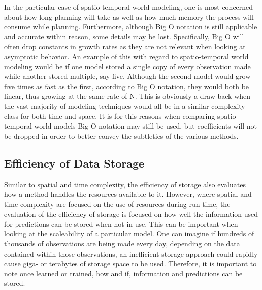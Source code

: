  In the particular case of spatio-temporal world modeling, one is most
  concerned about how long planning will take as well as how much memory the
  process will consume while planning. Furthermore, although Big O notation is
  still applicable and accurate within reason, some details may be lost.
  Specifically, Big O will often drop constants in growth rates as they are
  not relevant when looking at asymptotic behavior. An example of this with
  regard to spatio-temporal world modeling would be if one model stored a
  single copy of every observation made while another stored multiple, say
  five. Although the second model would grow five times as fast as the first,
  according to Big O notation, they would both be linear, thus growing at the
  same rate of N. This is obviously a draw back when the vast majority of
  modeling techniques would all be in a similar complexity class for both time
  and space. It is for this reasons when comparing spatio-temporal world
  models Big O notation may still be used, but coefficients will not be
  dropped in order to better convey the subtleties of the various methods.


  \subsection{ Efficiency of Data Storage }
  Similar to spatial and time complexity, the efficiency of storage also
  evaluates how a method handles the resources available to it. However, where
  spatial and time complexity are focused on the use of resources during
  run-time, the evaluation of the efficiency of storage is focused on how well
  the information used for predictions can be stored when not in use. This
  can be important when looking at the scaleability of a particular model. One
  can imagine if hundreds of thousands of observations are being made every
  day, depending on the data contained within those observations, an
  inefficient storage approach could rapidly cause giga- or terabytes of storage
  space to be used. Therefore, it is important to note once learned or trained,
  how and if, information and predictions can be stored.

